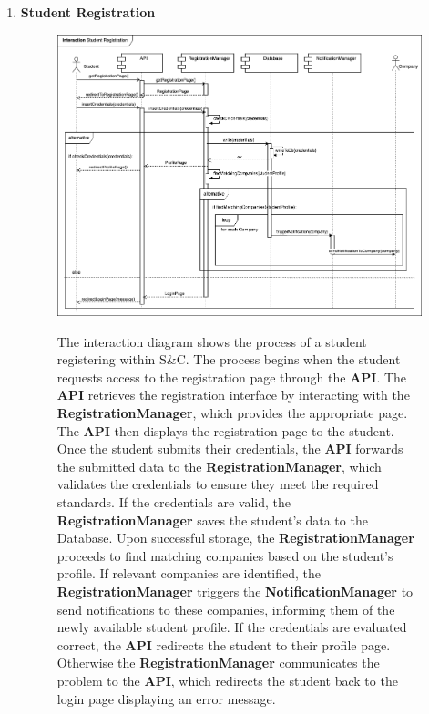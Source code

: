 \begin{enumerate}
    \newpage
    \item \textbf{Student Registration}
    \begin{figure}[h!]
            \centering  \includegraphics[width=1\textwidth]{DD/Images/Interactions/INT04_StudentRegistration.drawio.png}
            \label{fig:ComponentViewDiagram}
            \caption*{The interaction diagram shows the process of a student registering within S\&C. The process begins when the student requests access to the registration page through the \textbf{API}. The \textbf{API} retrieves the registration interface by interacting with the \textbf{RegistrationManager}, which provides the appropriate page. The \textbf{API} then displays the registration page to the student. Once the student submits their credentials, the \textbf{API} forwards the submitted data to the \textbf{RegistrationManager}, which validates the credentials to ensure they meet the required standards. If the credentials are valid, the \textbf{RegistrationManager} saves the student’s data to the Database. Upon successful storage, the \textbf{RegistrationManager} proceeds to find matching companies based on the student’s profile. If relevant companies are identified, the \textbf{RegistrationManager} triggers the \textbf{NotificationManager} to send notifications to these companies, informing them of the newly available student profile. If the credentials are evaluated correct, the \textbf{API} redirects the student to their profile page. Otherwise the \textbf{RegistrationManager} communicates the problem to the \textbf{API}, which redirects the student back to the login page displaying an error message.
            }
    \end{figure}


\end{enumerate}
